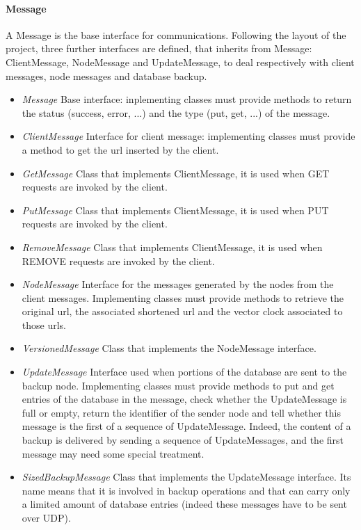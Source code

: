 \documentclass{article}
\begin{document}
\paragraph{Message} A Message is the base interface for communications. Following the layout of the project, three further interfaces are defined, that inherits from Message: ClientMessage, NodeMessage and UpdateMessage, to deal respectively with client messages, node messages and database backup. 
\begin{itemize}
\item \textit{Message} Base interface: inplementing classes must provide methods to return the status (success, error, ...) and the type (put, get, ...) of the message.
\item \textit{ClientMessage} Interface for client message: implementing classes must provide a method to get the url inserted by the client.
\item \textit{GetMessage} Class that implements ClientMessage, it is used when GET requests are invoked by the client.
\item \textit{PutMessage} Class that implements ClientMessage, it is used when PUT requests are invoked by the client.
\item \textit{RemoveMessage} Class that implements ClientMessage, it is used when REMOVE requests are invoked by the client.
\item \textit{NodeMessage} Interface for the messages generated by the nodes from the client messages. Implementing classes must provide methods to retrieve the original url, the associated shortened url and the vector clock associated to those urls.
\item \textit{VersionedMessage} Class that implements the NodeMessage interface.
\item \textit{UpdateMessage} Interface used when portions of the database are sent to the backup node. Implementing classes must provide methods to put and get entries of the database in the message, check whether the UpdateMessage is full or empty, return the identifier of the sender node and tell whether this message is the first of a sequence of UpdateMessage. Indeed, the content of a backup is delivered by sending a sequence of UpdateMessages, and the first message may need some special treatment.
\item \textit{SizedBackupMessage} Class that implements the UpdateMessage interface. Its name means that it is involved in backup operations and that can carry only a limited amount of database entries (indeed these messages have to be sent over UDP).
\end{itemize}
\end{document}
